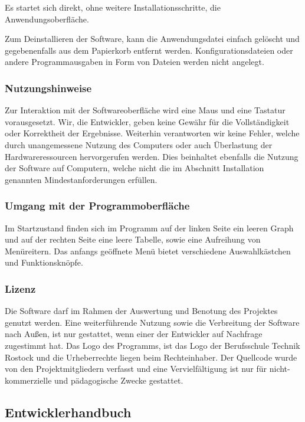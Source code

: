 \documentclass[a4paper]{article}
\begin{document}
    Es startet sich direkt, ohne weitere Installationsschritte, die Anwendungsoberfläche.

    Zum Deinstallieren der Software, kann die Anwendungsdatei einfach gelöscht und gegebenenfalls aus dem Papierkorb entfernt werden.
    Konfigurationsdateien oder andere Programmausgaben in Form von Dateien werden nicht angelegt.

    \subsubsection{Nutzungshinweise}
    
    Zur Interaktion mit der Softwareoberfläche wird eine Maus und eine Tastatur vorausgesetzt.
    Wir, die Entwickler, geben keine Gewähr für die Vollständigkeit oder Korrektheit der Ergebnisse.
    Weiterhin verantworten wir keine Fehler, welche durch unangemessene Nutzung des Computers oder auch Überlastung der Hardwareressourcen hervorgerufen werden.
    Dies beinhaltet ebenfalls die Nutzung der Software auf Computern, welche nicht die im Abschnitt Installation genannten Mindestanforderungen erfüllen.

    \subsubsection{Umgang mit der Programmoberfläche}
    
    Im Startzustand finden sich im Programm auf der linken Seite ein leeren Graph und auf der rechten Seite eine leere Tabelle, sowie eine Aufreihung von Menüreitern.
    Das anfangs geöffnete Menü bietet verschiedene Auswahlkästchen und Funktionsknöpfe.
    
    \subsubsection{Lizenz}
    
    Die Software darf im Rahmen der Auswertung und Benotung des Projektes genutzt werden.
    Eine weiterführende Nutzung sowie die Verbreitung der Software nach Außen, ist nur gestattet, wenn einer der Entwickler auf Nachfrage zugestimmt hat.
    Das Logo des Programms, ist das Logo der Berufsschule Technik Rostock und die Urheberrechte liegen beim Rechteinhaber.
    Der Quellcode wurde von den Projektmitgliedern verfasst und eine Vervielfältigung ist nur für nicht-kommerzielle und  pädagogische Zwecke gestattet.
    

\subsection{Entwicklerhandbuch}
\end{document}
